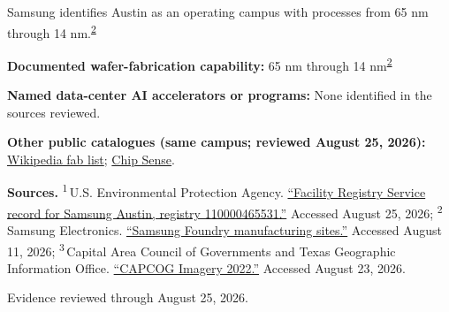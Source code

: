 \begin{minipage}[t][0.90\textheight][t]{\textwidth}
\begin{minipage}[t]{\textwidth}
\begin{minipage}[t]{0.32\textwidth}
\medskip
{\footnotesize Samsung identifies Austin as an operating campus with processes from 65 nm through 14 nm.\nobreak\textsuperscript{\href{\detokenize{https://semiconductor.samsung.com/foundry/manufacturing/manufacturing-sites/}}{\textcolor{accent}{2}}}\par}
\medskip
{\footnotesize\textbf{Documented wafer-fabrication capability:} 65 nm through 14 nm\nobreak\textsuperscript{\href{\detokenize{https://semiconductor.samsung.com/foundry/manufacturing/manufacturing-sites/}}{\textcolor{accent}{2}}}\par}
\end{minipage}
\end{minipage}
\par\vspace{0.65em}
\medskip
{\footnotesize\textbf{Named data-center AI accelerators or programs:} None identified in the sources reviewed.\par}
\smallskip
{\sffamily\scriptsize\color{black!62}\textbf{Other public catalogues (same campus; reviewed August 25, 2026):} \href{\detokenize{https://en.wikipedia.org/w/index.php?title=List_of_semiconductor_fabrication_plants&oldid=1370451124}\#\detokenize{Open_plants}}{Wikipedia fab list}; \href{\detokenize{https://github.com/aminalav/chip-sense/blob/93d22afe9e1309a7bebd6c7c96541f069f1d67ac/src/data/fab-sites.json}\#\detokenize{L53-L60}}{Chip Sense}.\par}
\medskip
{\sffamily\scriptsize\setlength{\emergencystretch}{1.5em}\textbf{Sources.} \textsuperscript{1}\,U.S. Environmental Protection Agency. \href{\detokenize{https://ofmpub.epa.gov/frs_public2/frs_rest_services.get_facilities?registry_id=110000465531&coordinates_output=yes&program_output=yes&output=JSON}}{\enquote{Facility Registry Service record for Samsung Austin, registry 110000465531.}} Accessed August 25, 2026; \textsuperscript{2}\,Samsung Electronics. \href{\detokenize{https://semiconductor.samsung.com/foundry/manufacturing/manufacturing-sites/}}{\enquote{Samsung Foundry manufacturing sites.}} Accessed August 11, 2026; \textsuperscript{3}\,Capital Area Council of Governments and Texas Geographic Information Office. \href{\detokenize{https://api.tnris.org/api/v1/collections/a15f67db-9535-464e-9058-f447325b6251}}{\enquote{CAPCOG Imagery 2022.}} Accessed August 23, 2026.\par}
\vfill
\noindent{\color{hairline}\rule{\linewidth}{0.4pt}}\par\smallskip
{\sffamily\scriptsize\color{black!58} Evidence reviewed through August 25, 2026.\par}
\end{minipage}
